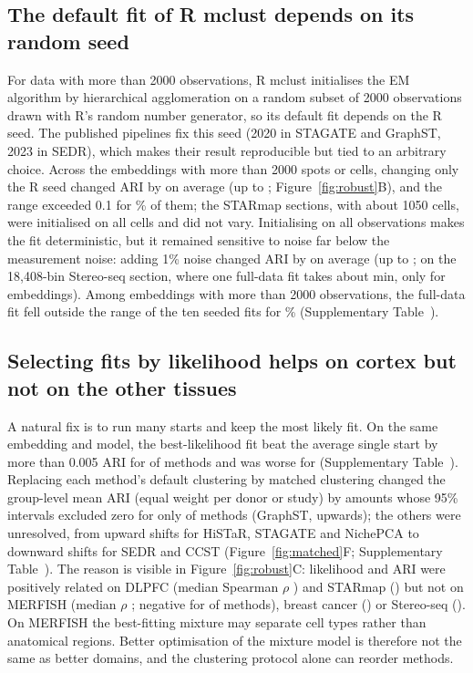 \documentclass[unnumsec,webpdf,contemporary,large]{oup-authoring-template}
\newcommand{\figref}[1]{Figure~\ref{#1}}
\begin{document}
\subsection{The default fit of R mclust depends on its random seed}
For data with more than 2000 observations, R mclust initialises the EM algorithm by hierarchical agglomeration on a random subset
of 2000 observations drawn with R's random number generator, so its default fit depends on the R seed. The published pipelines fix
this seed (2020 in STAGATE and GraphST, 2023 in SEDR), which makes their result reproducible but tied to an arbitrary choice. Across
the \mcsNBig{} embeddings with more than 2000 spots or cells, changing only the R seed changed ARI by \mcsSeedMeanBig{} on average
(up to \mcsSeedMax; \figref{fig:robust}B), and the range exceeded 0.1 for \mcsSeedGt\% of them; the STARmap sections, with about
1050 cells, were initialised on all cells and did not vary. Initialising on all observations makes the fit deterministic, but it remained sensitive to noise far below
the measurement noise: adding 1\% noise changed ARI by \mcsJitMean{} on average (up to \mcsJitMax; on the 18,408-bin Stereo-seq section, where one
full-data fit takes about \mcsFullMinBig{} min, only for \mcsJitNBig{} embeddings). Among embeddings with more than 2000 observations, the full-data fit
fell outside the range of the ten seeded fits for \mcsFullOutside\% (Supplementary Table~\STmclust).

\subsection{Selecting fits by likelihood helps on cortex but not on the other tissues}
A natural fix is to run many starts and keep the most likely fit. On the same embedding and model, the best-likelihood fit beat the
average single start by more than 0.005 ARI for \lotBLUp{} of \lotNMethods{} methods and was worse for \lotBLDown{} (Supplementary Table~\STlottery).
Replacing each method's default clustering by matched clustering changed the group-level mean ARI (equal weight per donor or
study) by amounts whose 95\% intervals excluded zero for only \vtNMatchedUp{} of \vtNMatched{} methods (GraphST, upwards); the others were
unresolved, from upward shifts for HiSTaR, STAGATE and NichePCA to downward shifts for SEDR and CCST (\figref{fig:matched}F; Supplementary
Table~\STgain). The reason is visible in \figref{fig:robust}C: likelihood and ARI were positively
related on DLPFC (median Spearman $\rho$ \rhoDlpfcMed) and STARmap (\rhoStarmapMed) but not on MERFISH (median $\rho$
\rhoMerfishMed; negative for \rhoNegMerfish{} of \lotNMethods{} methods), breast cancer (\rhoBrcaMed) or Stereo-seq
(\rhoStereoMed). On MERFISH the best-fitting mixture may separate cell types rather than anatomical regions.
Better optimisation of the mixture model is therefore not the same as better domains, and the clustering protocol alone can
reorder methods.
\end{document}
